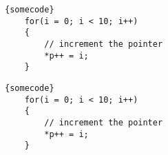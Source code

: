 \documentclass{article}
\begin{document}
\lstset{language=c++}
\begin{lstlisting}[frame=tb]{somecode}
    for(i = 0; i < 10; i++)
    {
        // increment the pointer
        *p++ = i;
    }
\end{lstlisting}

\begin{lstlisting}[frame=tb]{somecode}
    for(i = 0; i < 10; i++)
    {
        // increment the pointer
        *p++ = i;
    }
\end{lstlisting}
\end{document}
